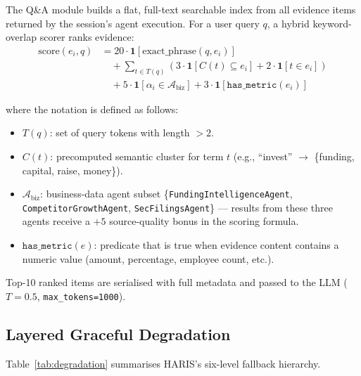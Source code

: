 \documentclass[preprint,12pt]{elsarticle}
\newcommand{\calA}{\mathcal{A}}
\begin{document}
The Q\&A module builds a flat, full-text searchable index from all evidence items
returned by the session's agent execution. For a user query $q$, a hybrid
keyword-overlap scorer ranks evidence:
\begin{align}
\text{score}(e_i, q) &= 20 \cdot \mathbf{1}[\text{exact\_phrase}(q, e_i)] \nonumber\\
  &\quad + \sum_{t \in T(q)} \!\left(3 \cdot \mathbf{1}[C(t) \subseteq e_i]
    + 2 \cdot \mathbf{1}[t \in e_i]\right) \nonumber\\
  &\quad + 5 \cdot \mathbf{1}[\alpha_i \in \calA_\text{biz}]
    + 3 \cdot \mathbf{1}[\texttt{has\_metric}(e_i)]
\label{eq:qa}
\end{align}

\noindent where the notation is defined as follows:
\begin{itemize}[nosep,leftmargin=1.5em]
  \item $T(q)$: set of query tokens with length $> 2$.
  \item $C(t)$: precomputed semantic cluster for term $t$
        (e.g., ``invest'' $\rightarrow$ \{funding, capital, raise, money\}).
  \item $\calA_\text{biz}$: business-data agent subset
        \{\texttt{FundingIntelligenceAgent}, \texttt{CompetitorGrowthAgent},
        \texttt{SecFilingsAgent}\} --- results from these three agents receive
        a $+5$ source-quality bonus in the scoring formula.
  \item $\texttt{has\_metric}(e)$: predicate that is true when evidence content
        contains a numeric value (amount, percentage, employee count, etc.).
\end{itemize}

\noindent Top-10 ranked items are serialised with full metadata and passed to
the LLM ($T{=}0.5$, \texttt{max\_tokens=1000}).

\subsection{Layered Graceful Degradation}
\label{sec:degradation}

Table~\ref{tab:degradation} summarises HARIS's six-level fallback hierarchy.
\end{document}
